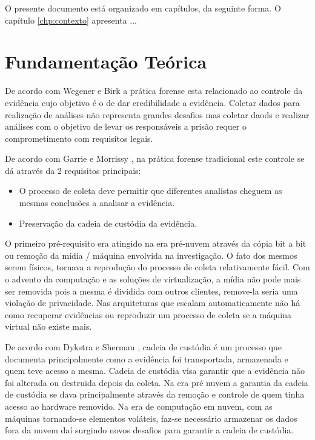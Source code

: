 \documentclass[
	12pt,				%
	openright,			%
	oneside,			%
	a4paper,			%
	english,			%
	brazil,				%
	]{abntex2}
\newcommand{\marcos}[1]{{\color{blue}{MARCOS: #1}}}
\begin{document}
O presente documento está organizado em capítulos, da seguinte forma.
%
O capítulo \ref{chp:contexto} apresenta ...

\chapter{Fundamentação Teórica}

\marcos{Discuta aqui os conceitos básicos necessários para entender sua solução e os trabalhos relacionados}

De acordo com Wegener e Birk \cite{Birk2011} a prática forense esta relacionado ao controle da evidência cujo objetivo é o de dar credibilidade a evidência.
Coletar dados para realização de análises não representa grandes desafios mas coletar daods e realizar análises com o objetivo de levar os responsáveis a prisão requer
o comprometimento com requisitos legais. 

De acordo com Garrie e Morrissy \cite{Garrie2014}, na prática forense tradicional este controle se dá através da 2 requisitos principais:

\begin{itemize}
 \item O processo de coleta deve permitir que diferentes analistas cheguem as mesmas conclusões a analisar a evidência.
 \item Preservação da cadeia de custódia da evidência.
\end{itemize}

O primeiro pré-requisito era atingido na era pré-nuvem através da cópia bit a bit ou remoção da mídia / máquina envolvida na investigação. O fato dos mesmos serem físicos,
tornava a reprodução do processo de coleta relativamente fácil. Com o advento da computação e as soluções de virtualização, a mídia não pode mais ser removida pois a 
mesma é dividida com outros clientes, remove-la seria uma violação de privacidade. Nas arquiteturas que escalam automaticamente não há como recuperar evidências ou reproduzir
um processo de coleta se a máquina virtual não existe mais. 

De acordo com Dykstra e Sherman \cite{Dykstra2012a}, cadeia de custódia é um processo que documenta principalmente como a evidência foi transportada, armazenada e quem teve
acesso a mesma. Cadeia de custódia visa garantir que a evidência não foi alterada ou destruida depois da coleta. Na era pré nuvem a garantia da cadeia de custódia se dava
principalmente através da remoção e controle de quem tinha acesso ao hardware removido. Na era de computação em nuvem, com as máquinas tornando-se elementos voláteis, faz-se
necessário armazenar os dados fora da nuvem daí surgindo novos desafios para garantir a cadeia de custódia.
\end{document}
